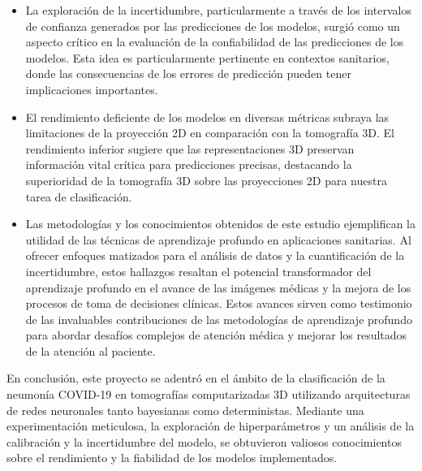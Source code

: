 \documentclass[10pt, oneside, a4paper]{article}
\begin{document}
\begin{itemize}
		\item La exploración de la incertidumbre, particularmente a través de los intervalos de confianza generados por las predicciones de los modelos, surgió como un aspecto crítico en la evaluación de la confiabilidad de las predicciones de los modelos. Esta idea es particularmente pertinente en contextos sanitarios, donde las consecuencias de los errores de predicción pueden tener implicaciones importantes. %
		
		\item El rendimiento deficiente de los modelos en diversas métricas subraya las limitaciones de la proyección 2D en comparación con la tomografía 3D. El rendimiento inferior sugiere que las representaciones 3D preservan información vital crítica para predicciones precisas, destacando la superioridad de la tomografía 3D sobre las proyecciones 2D para nuestra tarea de clasificación.
		
		\item Las metodologías y los conocimientos obtenidos de este estudio ejemplifican la utilidad de las técnicas de aprendizaje profundo en aplicaciones sanitarias. Al ofrecer enfoques matizados para el análisis de datos y la cuantificación de la incertidumbre, estos hallazgos resaltan el potencial transformador del aprendizaje profundo en el avance de las imágenes médicas y la mejora de los procesos de toma de decisiones clínicas. Estos avances sirven como testimonio de las invaluables contribuciones de las metodologías de aprendizaje profundo para abordar desafíos complejos de atención médica y mejorar los resultados de la atención al paciente.
	\end{itemize}
	
	En conclusión, este proyecto se adentró en el ámbito de la clasificación de la neumonía COVID-19 en tomografías computarizadas 3D utilizando arquitecturas de redes neuronales tanto bayesianas como deterministas. Mediante una experimentación meticulosa, la exploración de hiperparámetros y un análisis de la calibración y la incertidumbre del modelo, se obtuvieron valiosos conocimientos sobre el rendimiento y la fiabilidad de los modelos implementados.
\end{document}
